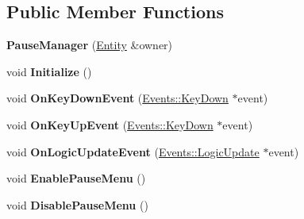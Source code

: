 \subsection*{Public Member Functions}
\begin{DoxyCompactItemize}
\item 
\hypertarget{classDCEngine_1_1Components_1_1PauseManager_a84fc4d07cb9efe47a8e839798095695d}{{\bfseries Pause\-Manager} (\hyperlink{classDCEngine_1_1Entity}{Entity} \&owner)}\label{classDCEngine_1_1Components_1_1PauseManager_a84fc4d07cb9efe47a8e839798095695d}

\item 
\hypertarget{classDCEngine_1_1Components_1_1PauseManager_a89adbd6631cea2f0030d51410e127a7d}{void {\bfseries Initialize} ()}\label{classDCEngine_1_1Components_1_1PauseManager_a89adbd6631cea2f0030d51410e127a7d}

\item 
\hypertarget{classDCEngine_1_1Components_1_1PauseManager_a569a19ca857513e2063309185f333d0a}{void {\bfseries On\-Key\-Down\-Event} (\hyperlink{classDCEngine_1_1Events_1_1KeyDown}{Events\-::\-Key\-Down} $\ast$event)}\label{classDCEngine_1_1Components_1_1PauseManager_a569a19ca857513e2063309185f333d0a}

\item 
\hypertarget{classDCEngine_1_1Components_1_1PauseManager_af2b8fd2a9677370d933a6c4449f77c64}{void {\bfseries On\-Key\-Up\-Event} (\hyperlink{classDCEngine_1_1Events_1_1KeyDown}{Events\-::\-Key\-Down} $\ast$event)}\label{classDCEngine_1_1Components_1_1PauseManager_af2b8fd2a9677370d933a6c4449f77c64}

\item 
\hypertarget{classDCEngine_1_1Components_1_1PauseManager_a1ecc26c79f75fd3e5ec247cf7f0616c7}{void {\bfseries On\-Logic\-Update\-Event} (\hyperlink{classDCEngine_1_1Events_1_1LogicUpdate}{Events\-::\-Logic\-Update} $\ast$event)}\label{classDCEngine_1_1Components_1_1PauseManager_a1ecc26c79f75fd3e5ec247cf7f0616c7}

\item 
\hypertarget{classDCEngine_1_1Components_1_1PauseManager_ae4efee92dbafdb229df416410fefc241}{void {\bfseries Enable\-Pause\-Menu} ()}\label{classDCEngine_1_1Components_1_1PauseManager_ae4efee92dbafdb229df416410fefc241}

\item 
\hypertarget{classDCEngine_1_1Components_1_1PauseManager_ae81303d956ff2f3aaae99bc618a411d5}{void {\bfseries Disable\-Pause\-Menu} ()}\label{classDCEngine_1_1Components_1_1PauseManager_ae81303d956ff2f3aaae99bc618a411d5}


\end{DoxyCompactItemize}
